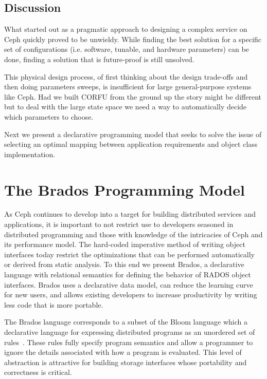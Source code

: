 \documentclass[10pt,twocolumn]{article}
\begin{document}
\subsection{Discussion}

What started out as a pragmatic approach to designing a complex service on Ceph
quickly proved to be unwieldy. While finding the best solution for a specific
set of configurations (i.e. software, tunable, and hardware parameters) can be
done, finding a solution that is future-proof is still unsolved. 

This physical design process, of first thinking about the design trade-offs and
then doing parameters sweeps, is insufficient for large general-purpose systems
like Ceph. Had we built CORFU from the ground up the story might be
different but to deal with the large state space we need a way to automatically
decide which parameters to choose. 

Next we present a declarative programming model that seeks to solve the issue
of selecting an optimal mapping between application requirements and object
class implementation.

\section{The Brados Programming Model}

As Ceph continues to develop into a target for building distributed services
and applications, it is important to not restrict use to developers seasoned
in distributed programming and those with knowledge of the intricacies of Ceph
and its performance model. The hard-coded imperative method of writing object
interfaces today restrict the optimizations that can be performed
automatically or derived from static analysis.  To this end we present Brados,
a declarative language with relational semantics for defining the behavior of
RADOS object interfaces.  Brados uses a declarative data model, can reduce the
learning curve for new users, and allows existing developers to increase
productivity by writing less code that is more portable.

The Brados language corresponds to a subset of the Bloom language which a
declarative language for expressing distributed programs as an unordered set
of rules~\cite{alvaro:cidr11}. These rules fully specify program semantics and allow a programmer
to ignore the details associated with how a program is evaluated. This level
of abstraction is attractive for building storage interfaces whose portability
and correctness is critical.
\end{document}
